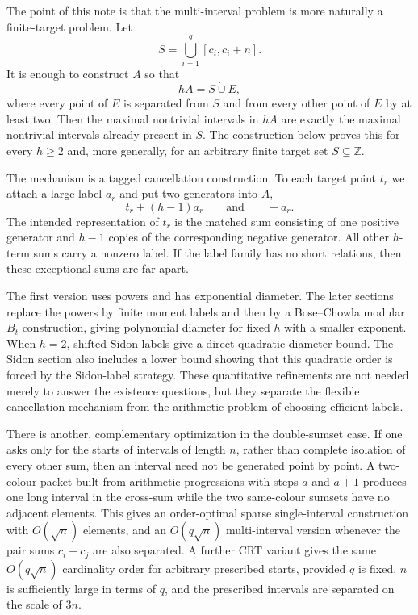 \documentclass[11pt]{article}
\newcommand{\Z}{\mathbb{Z}}
\begin{document}
The point of this note is that the multi-interval problem is more naturally a
finite-target problem. Let
\[
 S=\bigcup_{i=1}^q[c_i,c_i+n].
\]
It is enough to construct $A$ so that
\[
 hA=S\mathbin{\dot\cup}E,
\]
where every point of $E$ is separated from $S$ and from every other point of
$E$ by at least two. Then the maximal nontrivial intervals in $hA$ are
exactly the maximal nontrivial intervals already present in $S$. The
construction below proves this for every $h\geq 2$ and, more generally, for
an arbitrary finite target set $S\subseteq\Z$.

The mechanism is a tagged cancellation construction. To each target point
$t_r$ we attach a large label $a_r$ and put two generators into $A$,
\[
 t_r+(h-1)a_r
 \qquad\text{and}\qquad
 -a_r.
\]
The intended representation of $t_r$ is the matched sum consisting of one
positive generator and $h-1$ copies of the corresponding negative generator.
All other $h$-term sums carry a nonzero label. If the label family has no
short relations, then these exceptional sums are far apart.

The first version uses powers and has exponential diameter. The later
sections replace the powers by finite moment labels and then by a
Bose--Chowla modular $B_t$ construction, giving polynomial diameter for fixed
$h$ with a smaller exponent. When $h=2$, shifted-Sidon labels give a direct
quadratic diameter bound. The Sidon section also includes a lower bound
showing that this quadratic order is forced by the Sidon-label strategy.
These quantitative refinements are not needed merely to answer the existence
questions, but they separate the flexible cancellation mechanism from the
arithmetic problem of choosing efficient labels.

There is another, complementary optimization in the double-sumset case. If
one asks only for the starts of intervals of length $n$, rather than complete
isolation of every other sum, then an interval need not be generated point by
point. A two-colour packet built from arithmetic progressions with steps $a$
and $a+1$ produces one long interval in the cross-sum while the two same-colour
sumsets have no adjacent elements. This gives an order-optimal sparse
single-interval construction with $O(\sqrt n)$ elements, and an
$O(q\sqrt n)$ multi-interval version whenever the pair sums $c_i+c_j$ are
also separated. A further CRT variant gives the same $O(q\sqrt n)$
cardinality order for arbitrary prescribed starts, provided $q$ is fixed,
$n$ is sufficiently large in terms of $q$, and the prescribed intervals are
separated on the scale of $3n$.
\end{document}
